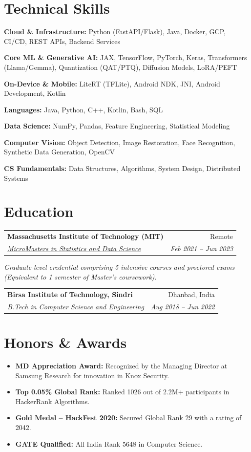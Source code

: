 \documentclass[10pt, letterpaper]{article}
\makeatletter
\newcommand{\resumeItem}[1]{
  \item\small{
    {#1 \vspace{-2pt}}
  }
}
\newcommand{\resumeSubheading}[4]{
  \vspace{-1pt}\item
    \begin{tabular*}{0.98\textwidth}[t]{l@{\extracolsep{\fill}}r}
      \textbf{#1} & {\small\color{darkgray} #2} \\
      \textit{\small#3} & \textit{\small\color{darkgray} #4} \\
    \end{tabular*}\vspace{-7pt}
}
\newcommand{\resumeSubHeadingListStart}{\begin{itemize}[leftmargin=0.15in, label={}]}
\newcommand{\resumeSubHeadingListEnd}{\end{itemize}}
\makeatother
\begin{document}
\section{Technical Skills}
 \begin{itemize}[leftmargin=0.12in, label={}]
    \small{\item{\textbf{Cloud \& Infrastructure:} Python (FastAPI/Flask), Java, Docker, GCP, CI/CD, REST APIs, Backend Services}}
    \small{\item{\textbf{Core ML \& Generative AI:} JAX, TensorFlow, PyTorch, Keras, Transformers (Llama/Gemma), Quantization (QAT/PTQ), Diffusion Models, LoRA/PEFT}}
    \small{\item{\textbf{On-Device \& Mobile:} LiteRT (TFLite), Android NDK, JNI, Android Development, Kotlin}}
    \small{\item{\textbf{Languages:} Java, Python, C++, Kotlin, Bash, SQL}}
    \small{\item{\textbf{Data Science:} NumPy, Pandas, Feature Engineering, Statistical Modeling}}
    \small{\item{\textbf{Computer Vision:} Object Detection, Image Restoration, Face Recognition, Synthetic Data Generation, OpenCV}}
    \small{\item{\textbf{CS Fundamentals:} Data Structures, Algorithms, System Design, Distributed Systems}}
 \end{itemize}

\section{Education}
  \resumeSubHeadingListStart
    \resumeSubheading
      {Massachusetts Institute of Technology (MIT)}{Remote}
      {\href{https://micromasters.mit.edu/ds}{MicroMasters in Statistics and Data Science}}{Feb 2021 -- Jun 2023}
      \vspace{-4pt}
      \small{\item{\textit{Graduate-level credential comprising 5 intensive courses and proctored exams (Equivalent to 1 semester of Master's coursework).}}}
    \resumeSubheading
      {Birsa Institute of Technology, Sindri}{Dhanbad, India}
      {B.Tech in Computer Science and Engineering}{Aug 2018 -- Jun 2022}
  \resumeSubHeadingListEnd

\section{Honors \& Awards}
  \resumeSubHeadingListStart
    \resumeItem{\textbf{MD Appreciation Award:} Recognized by the Managing Director at Samsung Research for innovation in Knox Security.}
    \resumeItem{\textbf{Top 0.05\% Global Rank:} Ranked 1026 out of 2.2M+ participants in HackerRank Algorithms.}
    \resumeItem{\textbf{Gold Medal -- HackFest 2020:} Secured Global Rank 29 with a rating of 2042.}
    \resumeItem{\textbf{GATE Qualified:} All India Rank 5648 in Computer Science.}
  \resumeSubHeadingListEnd
\end{document}
